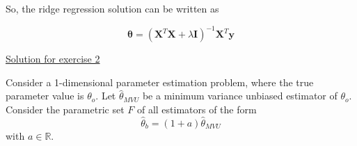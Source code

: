 \documentclass[12pt]{book}
\begin{document}
So, the ridge regression solution can be written as

\begin{equation*}
\bm{\theta} = (\mathbf{X}^T\mathbf{X} + \lambda \mathbf{I})^{-1}\mathbf{X}^T\mathbf{y}
\end{equation*}

\newpage

{\underline{\large Solution for exercise 2}}
\vspace{0.3 cm}

Consider a 1-dimensional parameter estimation problem, where the true parameter value is $\theta_o$. Let $\hat{\theta}_{MVU}$ be a minimum variance unbiased estimator of $\theta_o$. Consider the parametric set $F$ of all estimators of the form
\begin{equation*}
\hat{\theta}_{b} = (1+a)\hat{\theta}_{MVU}
\end{equation*}
with $a \in \mathbb{R}$.
\end{document}
